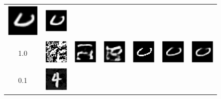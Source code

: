 \begin{figure}[h]
\begin{tabular}{cccc|ccc}
        \includegraphics[width=0.1\linewidth]{pics/3_adv_att/mnist_MCMC/mnist_MCMC_adv_rec_0_rad_0.8.pdf} &
        \includegraphics[width=0.1\linewidth]{pics/3_adv_att/mnist_MCMC/mnist_MCMC_adv_rec_t_0_rad_0.8.pdf} \\ 
        1.0 & \includegraphics[width=0.1\linewidth]{pics/3_adv_att/mnist_MCMC/mnist_noMCMC_adv_0_rad_1.0.pdf} & 
         \includegraphics[width=0.1\linewidth]{pics/3_adv_att/mnist_MCMC/mnist_noMCMC_adv_rec_0_rad_1.0.pdf} & 
          \includegraphics[width=0.1\linewidth]{pics/3_adv_att/mnist_MCMC/mnist_noMCMC_adv_rec_t_0_rad_1.0.pdf} &
           \includegraphics[width=0.1\linewidth]{pics/3_adv_att/mnist_MCMC/mnist_MCMC_adv_0_rad_1.0.pdf} &
           \includegraphics[width=0.1\linewidth]{pics/3_adv_att/mnist_MCMC/mnist_MCMC_adv_rec_0_rad_1.0.pdf} &
           \includegraphics[width=0.1\linewidth]{pics/3_adv_att/mnist_MCMC/mnist_MCMC_adv_rec_t_0_rad_1.0.pdf} \\\midrule
         0.1 & \includegraphics[width=0.1\linewidth]{pics/3_adv_att/mnist_MCMC/mnist_noMCMC_adv_3_rad_0.1.pdf} &

\end{tabular}
\end{figure}
